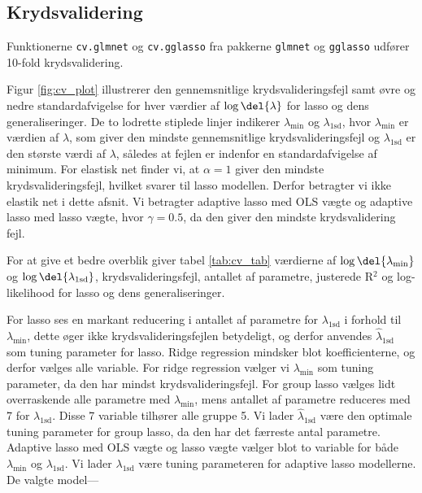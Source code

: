 \subsection{Krydsvalidering}
Funktionerne \texttt{cv.glmnet} og \texttt{cv.gglasso} fra pakkerne \texttt{glmnet} og \texttt{gglasso} udfører 10-fold krydsvalidering.

Figur \ref{fig:cv_plot} illustrerer den gennemsnitlige krydsvalideringsfejl samt øvre og nedre standardafvigelse for hver værdier af $\log \del{\lambda}$ for lasso og dens generaliseringer. 
De to lodrette stiplede linjer indikerer \(\lambda_{\text{min}}\) og \(\lambda_\text{1sd}\), hvor \(\lambda_{\text{min}}\) er værdien af \(\lambda\), som giver den mindste gennemsnitlige krydsvalideringsfejl og \(\lambda_\text{1sd}\) er den største værdi af \(\lambda\), således at fejlen er indenfor en standardafvigelse af minimum. 
For elastisk net finder vi, at $\alpha =1$ giver den mindste krydsvalideringsfejl, hvilket svarer til lasso modellen. Derfor betragter vi ikke elastik net i dette afsnit. 
Vi betragter adaptive lasso med OLS vægte og adaptive lasso med lasso vægte, hvor $\gamma = 0.5$, da den giver den mindste krydsvalidering fejl. 

%



For at give et bedre overblik giver tabel \ref{tab:cv_tab} værdierne af $\log \del{ \lambda_{\min}}$ og $\log \del{ \lambda_{1\text{sd}}}$, krydsvalideringsfejl, antallet af parametre, justerede R$^2$ og log-likelihood for lasso og dens generaliseringer.

For lasso ses en markant reducering i antallet af parametre for $\lambda_{1\text{sd}}$ i forhold til $\lambda_{\min}$, dette øger ikke krydsvalideringsfejlen betydeligt, og derfor anvendes $\widehat{\lambda}_{1\text{sd}}$ som tuning parameter for lasso. 
Ridge regression mindsker blot koefficienterne, og derfor vælges alle variable. For ridge regression vælger vi \(\lambda_{\min}\) som tuning parameter, da den har mindst krydsvalideringsfejl.
For group lasso vælges lidt overraskende alle parametre med \(\lambda_\text{min}\), mens antallet af parametre reduceres med 7 for $\lambda_{1\text{sd}}$. 
Disse 7 variable tilhører alle gruppe 5.
Vi lader $\widehat{\lambda}_{1\text{sd}}$ være den optimale tuning parameter for group lasso, da den har det færreste antal parametre.
Adaptive lasso med OLS vægte og lasso vægte vælger blot to variable for både \(\lambda_\text{min}\) og \(\lambda_{1\text{sd}}\).
Vi lader $\lambda_{1\text{sd}}$ være tuning parameteren for adaptive lasso modellerne.  
De valgte model---

